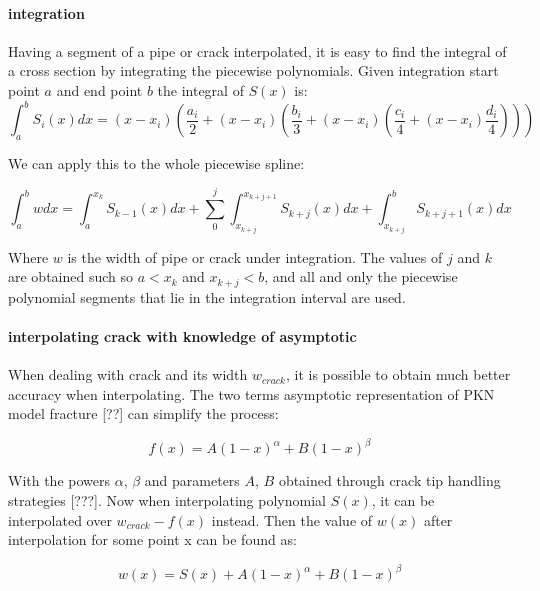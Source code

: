 \paragraph{integration}

Having a segment of a pipe or crack interpolated, it is easy to find the integral of a cross section by integrating the piecewise polynomials. 
Given integration start point $a$ and end point $b$ the integral of $S(x)$ is:
\begin{equation}
\int_a^b S_i(x) dx=(x-x_i)\left(\frac{a_i}{2}+\left(x-x_i\right)\left(\frac{b_i}{3}+\left(x-x_i\right)\left(\frac{c_i}{4}+\left(x-x_i\right) \frac{d_i}{4}\right)\right)\right)
\end{equation}

We can apply this to the whole piecewise spline:

\begin{equation}
\int_a^b w dx=\int_a^{x_{k}} S_{k-1}(x) dx+\sum_0^{j} \int_{x_{k+j}}^{x_{k+j+1}} S_{k+j}(x) dx+\int_{x_{k+j}}^{b} S_{k+j+1}(x) dx
\end{equation}

Where $w$ is the width of pipe or crack under integration. The values of $j$ and $k$ are obtained such so $a<x_k$ and $x_{k+j}<b$, and all and only the piecewise polynomial segments that lie in the integration interval are used.

\paragraph{interpolating crack with knowledge of asymptotic}

When dealing with crack and its width $w_{crack}$, it is possible to obtain much better accuracy when interpolating. The two terms asymptotic representation of PKN model fracture [??] can simplify the process: 

\begin{equation}
f(x)=A(1-x)^\alpha+B(1-x)^\beta
\end{equation}

With the powers $\alpha$, $\beta$ and parameters $A$, $B$ obtained through crack tip handling strategies [???]. Now when interpolating polynomial $S(x)$, it can be interpolated over $w_{crack}-f(x)$ instead. Then the value of $w(x)$ after interpolation for some point x can be found as:

\begin{equation}
w(x)=S(x)+A(1-x)^\alpha+B(1-x)^\beta
\end{equation}

